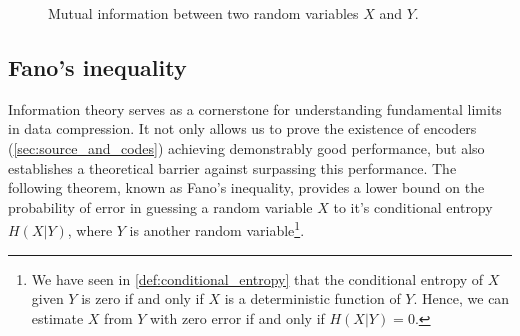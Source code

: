 \begin{figure}[h!]
    \centering
    \caption{Mutual information between two random variables $X$ and $Y$.}
\end{figure}


\subsection{Fano's inequality}

Information theory serves as a cornerstone for understanding fundamental limits in data compression. It not only allows us to prove the existence of encoders (\autoref{sec:source_and_codes}) achieving demonstrably good performance, but also establishes a theoretical barrier against surpassing this performance. The following theorem, known as Fano's inequality, provides a lower bound on the probability of error in guessing a random variable $X$ to it's conditional entropy $H(X|Y)$, where $Y$ is another random variable\footnote{We have seen in \ref{def:conditional_entropy} that the conditional entropy of $X$ given $Y$ is zero if and only if $X$ is a deterministic function of $Y$. Hence, we can estimate $X$ from $Y$ with zero error if and only if $H(X|Y) = 0$.}.

